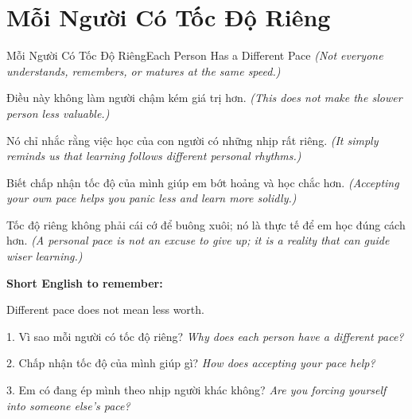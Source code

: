\section{Mỗi Người Có Tốc Độ Riêng}
\begin{truyen}{Mỗi Người Có Tốc Độ Riêng}{Each Person Has a Different Pace}
\textit{(Not everyone understands, remembers, or matures at the same speed.)}

Điều này không làm người chậm kém giá trị hơn.
\textit{(This does not make the slower person less valuable.)}

Nó chỉ nhắc rằng việc học của con người có những nhịp rất riêng.
\textit{(It simply reminds us that learning follows different personal rhythms.)}

Biết chấp nhận tốc độ của mình giúp em bớt hoảng và học chắc hơn.
\textit{(Accepting your own pace helps you panic less and learn more solidly.)}
\end{truyen}

\begin{baihoc}
Tốc độ riêng không phải cái cớ để buông xuôi; nó là thực tế để em học đúng cách hơn.
\textit{(A personal pace is not an excuse to give up; it is a reality that can guide wiser learning.)}
\end{baihoc}

\begin{ghinhoanh}
\textbf{Short English to remember:}

Different pace does not mean less worth.

\end{ghinhoanh}

\begin{tuhocnhanh}
1. Vì sao mỗi người có tốc độ riêng? \textit{Why does each person have a different pace?}

2. Chấp nhận tốc độ của mình giúp gì? \textit{How does accepting your pace help?}

3. Em có đang ép mình theo nhịp người khác không? \textit{Are you forcing yourself into someone else's pace?}
\end{tuhocnhanh}
\ngancach

